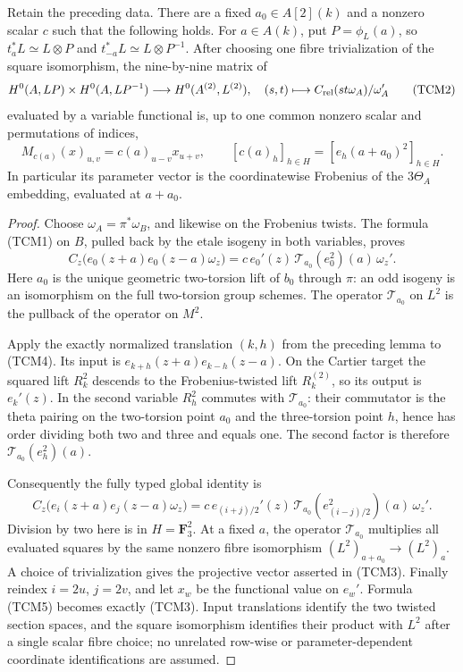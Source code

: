 \begin{proposition}
\label{prop:ppav-Cartier-cross-Moore-identification}
Retain the preceding data.  There are a fixed \(a_0\in A[2](k)\)
and a nonzero scalar \(c\) such that the following holds.  For
\(a\in A(k)\), put \(P=\phi_L(a)\), so
\(t_a^*L\simeq L\otimes P\) and
\(t_{-a}^*L\simeq L\otimes P^{-1}\).
After choosing one fibre trivialization of the square isomorphism,
the nine-by-nine matrix of
\[
 H^0(A,LP)\times H^0(A,LP^{-1})
 \longrightarrow H^0(A^{(2)},L^{(2)}),\quad
 (s,t)\longmapsto C_{\rm rel}(st\omega_A)/\omega_A'
                                                        \tag{TCM2}
\]
evaluated by a variable functional is, up to one common nonzero
scalar and permutations of indices,
\[
 M_{c(a)}(x)_{u,v}=c(a)_{u-v}x_{u+v},\qquad
 [c(a)_h]_{h\in H}=[e_h(a+a_0)^2]_{h\in H}.             \tag{TCM3}
\]
In particular its parameter vector is the coordinatewise Frobenius
of the \(3\Theta_A\) embedding, evaluated at \(a+a_0\).
\end{proposition}
\begin{proof}
Choose \(\omega_A=\pi^*\omega_B\), and likewise on the Frobenius
twists.  The formula (TCM1) on \(B\), pulled back by the etale
isogeny in both variables, proves
\[
 C_z\bigl(e_0(z+a)e_0(z-a)\omega_z\bigr)
    =c\,e_0'(z)\,\mathcal T_{a_0}(e_0^2)(a)\,\omega_z'.
                                                        \tag{TCM4}
\]
Here \(a_0\) is the unique geometric two-torsion lift of \(b_0\)
through \(\pi\): an odd isogeny is an isomorphism on the full
two-torsion group schemes.  The operator \(\mathcal T_{a_0}\)
on \(L^2\) is the pullback of the operator on \(M^2\).

Apply the exactly normalized translation \((k,h)\) from the
preceding lemma to (TCM4).  Its input is
\(e_{k+h}(z+a)e_{k-h}(z-a)\).  On the Cartier target the squared
lift \(R_k^2\) descends to the Frobenius-twisted lift \(R_k^{(2)}\),
so its output is \(e_k'(z)\).  In the second variable
\(R_h^2\) commutes with \(\mathcal T_{a_0}\): their commutator
is the theta pairing on the two-torsion point \(a_0\) and the
three-torsion point \(h\), hence has order dividing both two and
three and equals one.  The second factor is therefore
\(\mathcal T_{a_0}(e_h^2)(a)\).

Consequently the fully typed global identity is
\[
 C_z\bigl(e_i(z+a)e_j(z-a)\omega_z\bigr)
   =c\,e_{(i+j)/2}'(z)\,
       \mathcal T_{a_0}(e_{(i-j)/2}^2)(a)\,\omega_z'.     \tag{TCM5}
\]
Division by two here is in \(H=\mathbf F_3^2\).
At a fixed \(a\), the operator \(\mathcal T_{a_0}\) multiplies
all evaluated squares by the same nonzero fibre isomorphism
\((L^2)_{a+a_0}\to(L^2)_a\).  A choice of trivialization gives
the projective vector asserted in (TCM3).
Finally reindex \(i=2u\), \(j=2v\), and let \(x_w\) be the
functional value on \(e_w'\).  Formula (TCM5) becomes exactly
(TCM3).  Input translations identify the two twisted section
spaces, and the square isomorphism identifies their product with
\(L^2\) after a single scalar fibre choice; no unrelated row-wise
or parameter-dependent coordinate identifications are assumed.
\end{proof}

